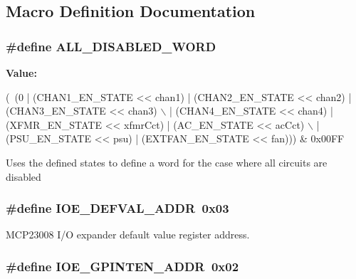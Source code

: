 \subsection{Macro Definition Documentation}
\hypertarget{a00023_a79846f375935e81b3781b88b40405d38}{
\subsubsection[{A\-L\-L\-\_\-\-D\-I\-S\-A\-B\-L\-E\-D\-\_\-\-W\-O\-R\-D}]{\setlength{\rightskip}{0pt plus 5cm}\#define A\-L\-L\-\_\-\-D\-I\-S\-A\-B\-L\-E\-D\-\_\-\-W\-O\-R\-D}}\label{a00023_a79846f375935e81b3781b88b40405d38}
{\bfseries Value\-:}
\begin{DoxyCode}
(~(0 | (CHAN1\_EN\_STATE << chan1) | (CHAN2\_EN\_STATE << chan2) | (CHAN3\_EN\_STATE << chan3) \(\backslash\)
                               | (CHAN4\_EN\_STATE << chan4) | (XFMR\_EN\_STATE << xfmrCct) | (AC\_EN\_STATE << 
      acCct) \(\backslash\)
                               | (PSU\_EN\_STATE << psu) | (EXTFAN\_EN\_STATE << fan))) & 0x00FF
\end{DoxyCode}
Uses the defined states to define a word for the case where all circuits are disabled \hypertarget{a00023_a687e15212e8d4b49c12159dce73eeeab}{
\subsubsection[{I\-O\-E\-\_\-\-D\-E\-F\-V\-A\-L\-\_\-\-A\-D\-D\-R}]{\setlength{\rightskip}{0pt plus 5cm}\#define I\-O\-E\-\_\-\-D\-E\-F\-V\-A\-L\-\_\-\-A\-D\-D\-R~0x03}}\label{a00023_a687e15212e8d4b49c12159dce73eeeab}
M\-C\-P23008 I/\-O expander default value register address. \hypertarget{a00023_aa68be5a6ed28fb146600b4fd2d11fafd}{
\subsubsection[{I\-O\-E\-\_\-\-G\-P\-I\-N\-T\-E\-N\-\_\-\-A\-D\-D\-R}]{\setlength{\rightskip}{0pt plus 5cm}\#define I\-O\-E\-\_\-\-G\-P\-I\-N\-T\-E\-N\-\_\-\-A\-D\-D\-R~0x02}}\label{a00023_aa68be5a6ed28fb146600b4fd2d11fafd}
